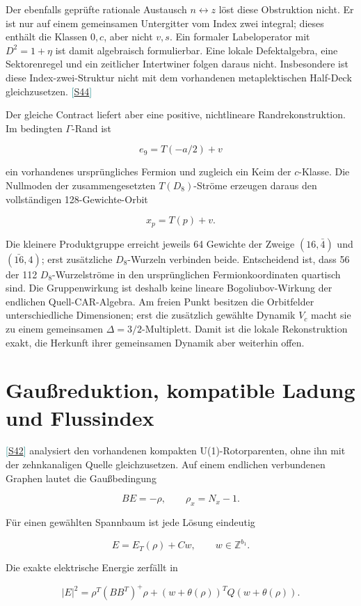 \documentclass[11pt,a4paper,oneside,parskip=half,headings=normal,numbers=noenddot,bibliography=totoc]{scrreprt}
\newcommand{\src}[1]{\textcolor{teal}{\small[\hyperref[s:#1]{S#1}]}}
\begin{document}
Der ebenfalls geprüfte rationale Austausch \(n\leftrightarrow z\) löst diese Obstruktion nicht. Er ist nur auf einem gemeinsamen Untergitter vom Index zwei integral; dieses enthält die Klassen \(0,c\), aber nicht \(v,s\). Ein formaler Labeloperator mit \(D^2=1+\eta\) ist damit algebraisch formulierbar. Eine lokale Defektalgebra, eine Sektorenregel und ein zeitlicher Intertwiner folgen daraus nicht. Insbesondere ist diese Index-zwei-Struktur nicht mit dem vorhandenen metaplektischen Half-Deck gleichzusetzen. \src{44}

Der gleiche Contract liefert aber eine positive, nichtlineare Randrekonstruktion. Im bedingten \(\Gamma\)-Rand ist

\[
e_9=T(-a/2)+v
\]

ein vorhandenes ursprüngliches Fermion und zugleich ein Keim der \(c\)-Klasse. Die Nullmoden der zusammengesetzten \(T(D_8)\)-Ströme erzeugen daraus den vollständigen 128-Gewichte-Orbit

\[
x_p=T(p)+v.
\]

Die kleinere Produktgruppe erreicht jeweils 64 Gewichte der Zweige \((16,\bar4)\) und \((\bar{16},4)\); erst zusätzliche \(D_8\)-Wurzeln verbinden beide. Entscheidend ist, dass 56 der 112 \(D_8\)-Wurzelströme in den ursprünglichen Fermionkoordinaten quartisch sind. Die Gruppenwirkung ist deshalb keine lineare Bogoliubov-Wirkung der endlichen Quell-CAR-Algebra. Am freien Punkt besitzen die Orbitfelder unterschiedliche Dimensionen; erst die zusätzlich gewählte Dynamik \(V_c\) macht sie zu einem gemeinsamen \(\Delta=3/2\)-Multiplett. Damit ist die lokale Rekonstruktion exakt, die Herkunft ihrer gemeinsamen Dynamik aber weiterhin offen.

\section{Gaußreduktion, kompatible Ladung und Flussindex}

\src{42} analysiert den vorhandenen kompakten U(1)-Rotorparenten, ohne ihn mit der zehnkanaligen Quelle gleichzusetzen. Auf einem endlichen verbundenen Graphen lautet die Gaußbedingung

\[
BE=-\rho,\qquad \rho_x=N_x-1.
\]

Für einen gewählten Spannbaum ist jede Lösung eindeutig

\[
E=E_T(\rho)+Cw,\qquad w\in\mathbb Z^{b_1}.
\]

Die exakte elektrische Energie zerfällt in

\[
|E|^2=\rho^T(BB^T)^+\rho+(w+\theta(\rho))^TQ(w+\theta(\rho)).
\]
\end{document}
